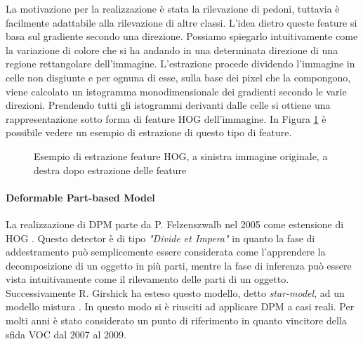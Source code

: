 La motivazione per la realizzazione è stata la rilevazione di pedoni, tuttavia è facilmente adattabile alla rilevazione di altre classi. 
L'idea dietro queste feature si basa sul gradiente secondo una direzione. Possiamo spiegarlo intuitivamente come la variazione di colore che si ha andando in una determinata direzione di una regione rettangolare dell'immagine. 
L'estrazione procede dividendo l'immagine in celle non disgiunte e per ognuna di esse, sulla base dei pixel che la compongono, viene calcolato un istogramma monodimensionale dei gradienti secondo le varie direzioni. Prendendo tutti gli istogrammi derivanti dalle celle si ottiene una rappresentazione sotto forma di feature \ac{HOG} dell'immagine. In Figura \ref{fig:hog} è possibile vedere un esempio di estrazione di questo tipo di feature.
\begin{figure}[]
    \centering
    \caption{Esempio di estrazione feature HOG, a sinistra immagine originale, a destra dopo estrazione delle feature} 
    \label{fig:hog} 
\end{figure}

\paragraph{Deformable Part-based Model} 
La realizzazione di \ac{DPM} parte da P. Felzenszwalb nel 2005 come estensione di \ac{HOG} \cite{felzenszwalb2008discriminatively}. Questo detector è di tipo \textit{"Divide et Impera"} in quanto la fase di addestramento può semplicemente essere considerata come l'apprendere la decomposizione di un oggetto in più parti, mentre la fase di inferenza può essere vista intuitivamente come il rilevamento delle parti di un oggetto. 
Successivamente R. Girshick ha esteso questo modello, detto \textit{star-model}, ad un modello mistura \cite{felzenszwalb2010cascade, felzenszwalb2009object, girshick2011object, girshick2012rigid}. In questo modo si è riusciti ad applicare \ac{DPM} a casi reali. Per molti anni è stato considerato un punto di riferimento in quanto vincitore della sfida \ac{VOC} dal 2007 al 2009.

